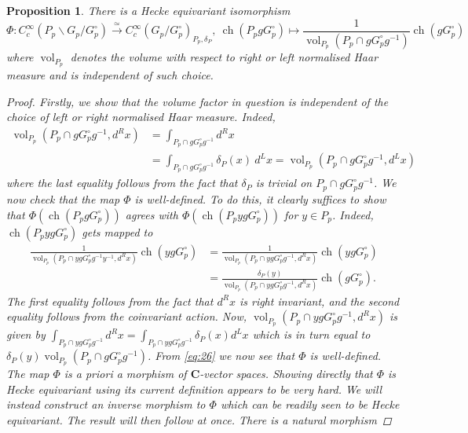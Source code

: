 \documentclass[10pt,a4paper]{amsart}
\newtheorem{prop}{Proposition}
\DeclareMathOperator{\ch}{ch}
\DeclareMathOperator{\vol}{vol}
\begin{document}
\begin{prop}\label{prop from inv to coinv}
    There is a Hecke equivariant isomorphism
    $$\Phi: C_c^\infty(P_p\backslash G_p/G_p^\circ)\overset{\simeq}{\longrightarrow} C_c^\infty(G_p/G_p^\circ)_{P_p,\delta_P},\ \ch(P_pgG_p^\circ)\mapsto\frac{1}{\vol_{P_p}\left(P_p\cap g G_p^\circ g^{-1}\right)}\ch( gG_p^\circ)$$
    where $\vol_{P_p}$ denotes the volume with respect to right or left normalised Haar measure and is independent of such choice.
    \begin{proof}
    Firstly, we show that the volume factor in question is independent of the choice of left or right normalised Haar measure. Indeed, 
    \begin{align*}
        \vol_{P_p}(P_p\cap g G_p^\circ g^{-1},d^Rx)&=\int_{P_p\cap gG_p^\circ g^{-1}} d^Rx\\
        &=\int_{P_p\cap g G_p^\circ g^{-1}} \delta_P(x)\ d^Lx=\vol_{P_p}(P_p\cap g G_p^\circ g^{-1},d^Lx)
    \end{align*}
    where the last equality follows from the fact that $\delta_P$ is trivial on $P_p\cap gG_p^\circ g^{-1}$.
        We now check that the map $\Phi$ is well-defined. To do this, it clearly suffices to show that $\Phi(\ch(P_p g G_p^\circ))$ agrees with $\Phi(\ch(P_p yg G_p^\circ))$ for $y\in P_p$. Indeed, $\ch(P_p yg G_p^\circ)$ gets mapped to 
        \begin{align}\label{eq:26}
            \frac{1}{\vol_{P_p}(P_p\cap yg G_p^\circ g^{-1}y^{-1},d^Rx)}\ch(yg G_p^\circ)&=\frac{1}{\vol_{P_p}(P_p\cap yg G_p^\circ g^{-1},d^Rx)}\ch(yg G_p^\circ)\\
           \nonumber &=\frac{\delta_P(y)}{\vol_{P_p}(P_p\cap yg G_p^\circ g^{-1},d^Rx)}\ch(gG_p^\circ).
        \end{align}
        The first equality follows from the fact that $d^Rx$ is right invariant, and the second equality follows from the coinvariant action.
        Now, $\vol_{P_p}(P_p\cap yg G_p^\circ g^{-1},d^Rx)$ is given by $\int_{P_p\cap yg G_p^\circ g^{-1}} d^Rx= \int_{P_p\cap yg G_p^\circ g^{-1}} \delta_P(x) d^Lx$ which is in turn equal to $\delta_P(y) \vol_{P_p}\left(P_p\cap g G_p^\circ g^{-1}\right)$. From \eqref{eq:26} we now see that $\Phi$ is well-defined. The map $\Phi$ is a priori a morphism of $\mathbf{C}$-vector spaces.  Showing directly that $\Phi$ is Hecke equivariant using its current definition appears to be very hard. We will instead construct an inverse morphism to $\Phi$ which can be readily seen to be Hecke equivariant. The result will then follow at once. There is a natural morphism 

\end{proof}
\end{prop}
\end{document}
